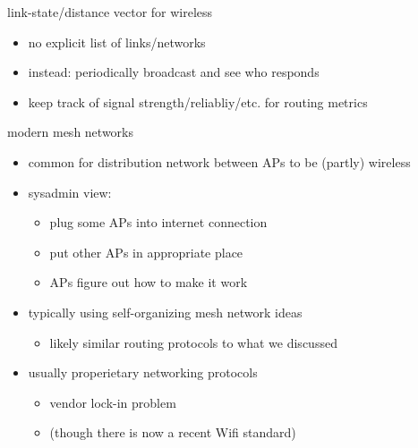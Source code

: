\begin{frame}{link-state/distance vector for wireless}
    \begin{itemize}
    \item no explicit list of links/networks
    \item instead: periodically broadcast and see who responds
    \item keep track of signal strength/reliabliy/etc. for routing metrics
    \end{itemize}
\end{frame}

\begin{frame}{modern mesh networks}
    \begin{itemize}
    \item common for distribution network between APs to be (partly) wireless
    \item sysadmin view:
        \begin{itemize}
        \item plug some APs into internet connection
        \item put other APs in appropriate place
        \item APs figure out how to make it work
        \end{itemize}
    \vspace{.5cm}
    \item typically using self-organizing mesh network ideas
        \begin{itemize}
        \item likely similar routing protocols to what we discussed
        \end{itemize}
    \item usually properietary networking protocols
        \begin{itemize}
        \item vendor lock-in problem
        \item (though there is now a recent Wifi standard)
        \end{itemize}
    \end{itemize}
\end{frame}


